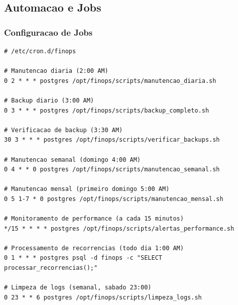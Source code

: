 \subsection{Automacao e Jobs}

\subsubsection{Configuracao de Jobs}

\begin{lstlisting}[caption=Configuracao de cron jobs]
# /etc/cron.d/finops

# Manutencao diaria (2:00 AM)
0 2 * * * postgres /opt/finops/scripts/manutencao_diaria.sh

# Backup diario (3:00 AM)
0 3 * * * postgres /opt/finops/scripts/backup_completo.sh

# Verificacao de backup (3:30 AM)
30 3 * * * postgres /opt/finops/scripts/verificar_backups.sh

# Manutencao semanal (domingo 4:00 AM)
0 4 * * 0 postgres /opt/finops/scripts/manutencao_semanal.sh

# Manutencao mensal (primeiro domingo 5:00 AM)
0 5 1-7 * 0 postgres /opt/finops/scripts/manutencao_mensal.sh

# Monitoramento de performance (a cada 15 minutos)
*/15 * * * * postgres /opt/finops/scripts/alertas_performance.sh

# Processamento de recorrencias (todo dia 1:00 AM)
0 1 * * * postgres psql -d finops -c "SELECT processar_recorrencias();"

# Limpeza de logs (semanal, sabado 23:00)
0 23 * * 6 postgres /opt/finops/scripts/limpeza_logs.sh
\end{lstlisting}
